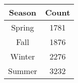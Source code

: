 \begin{center}
  \begin{tabular}{ c c }
    \hline
    Season & Count \\
    \hline
    Spring & 1781 \\
    Fall & 1876 \\
    Winter & 2276 \\
    Summer & 3232 \\
    \hline
  \end{tabular}
\end{center}
